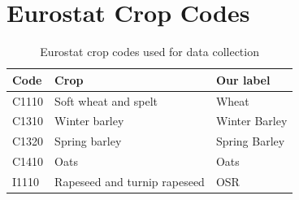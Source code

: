 \documentclass[12pt,a4paper]{report}
\begin{document}
\chapter{Eurostat Crop Codes}

\begin{table}[H]
\centering
\caption{Eurostat crop codes used for data collection}
\begin{tabular}{lll}
\toprule
\textbf{Code} & \textbf{Crop} & \textbf{Our label} \\
\midrule
C1110 & Soft wheat and spelt & Wheat \\
C1310 & Winter barley & Winter Barley \\
C1320 & Spring barley & Spring Barley \\
C1410 & Oats & Oats \\
I1110 & Rapeseed and turnip rapeseed & OSR \\
\bottomrule
\end{tabular}
\end{table}
\end{document}
